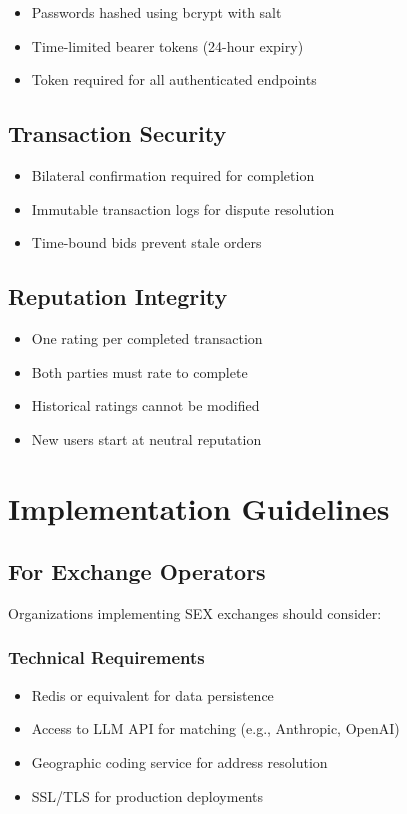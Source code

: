 \documentclass[11pt,a4paper]{article}
\begin{document}
\begin{itemize}
    \item Passwords hashed using bcrypt with salt
    \item Time-limited bearer tokens (24-hour expiry)
    \item Token required for all authenticated endpoints
\end{itemize}

\subsection{Transaction Security}

\begin{itemize}
    \item Bilateral confirmation required for completion
    \item Immutable transaction logs for dispute resolution
    \item Time-bound bids prevent stale orders
\end{itemize}

\subsection{Reputation Integrity}

\begin{itemize}
    \item One rating per completed transaction
    \item Both parties must rate to complete
    \item Historical ratings cannot be modified
    \item New users start at neutral reputation
\end{itemize}

\section{Implementation Guidelines}

\subsection{For Exchange Operators}

Organizations implementing SEX exchanges should consider:

\subsubsection{Technical Requirements}
\begin{itemize}
    \item Redis or equivalent for data persistence
    \item Access to LLM API for matching (e.g., Anthropic, OpenAI)
    \item Geographic coding service for address resolution
    \item SSL/TLS for production deployments
\end{itemize}
\end{document}

